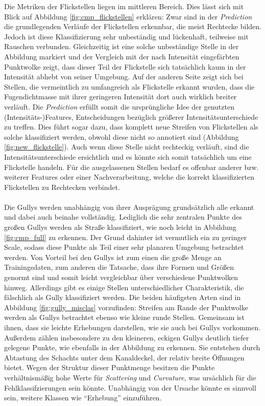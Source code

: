 Die Metriken der Flickstellen liegen im mittleren Bereich. Dies lässt sich mit Blick auf Abbildung \ref{fig:cmp_flickstellen} erklären: Zwar sind in der \textit{Prediction} die grundlegenden Verläufe der Flickstellen erkennbar, die meist Rechtecke bilden. Jedoch ist diese Klassifizierung sehr unbeständig und lückenhaft, teilweise mit Rauschen verbunden. Gleichzeitig ist eine solche unbeständige Stelle in der Abbildung markiert und der Vergleich mit der nach Intensität eingefärbten Punktwolke zeigt, dass dieser Teil der Flickstelle sich tatsächlich kaum in der Intensität abhebt von seiner Umgebung. Auf der anderen Seite zeigt sich bei Stellen, die vermeintlich zu umfangreich als Flickstelle erkannt wurden, dass die Fugendichtmasse mit ihrer geringeren Intensität dort auch wirklich breiter verläuft. Die \textit{Prediction} erfüllt somit die ursprüngliche Idee der genutzten (Intensitäts-)Features, Entscheidungen bezüglich größerer Intensitätsunterschiede zu treffen. Dies führt sogar dazu, dass komplett neue Streifen von Flickstellen als solche klassifiziert werden, obwohl diese nicht so annotiert sind (Abbildung \ref{fig:new_flickstelle}). Auch wenn diese Stelle nicht rechteckig verläuft, sind die Intensitätsunterschiede ersichtlich und es könnte sich somit tatsächlich um eine Flickstelle handeln. Für die ausgelassenen Stellen bedarf es offenbar anderer bzw. weiterer Features oder einer Nachverarbeitung, welche die korrekt klassifizierten Flickstellen zu Rechtecken verbindet. \\\\
Die Gullys werden unabhängig von ihrer Ausprägung grundsätzlich alle erkannt und dabei auch beinahe vollständig. Lediglich die sehr zentralen Punkte des großen Gullys werden als Straße klassifiziert, wie noch leicht in Abbildung \ref{fig:cmp_full} zu erkennen. Der Grund dahinter ist vermutlich ein zu geringer Scale, sodass diese Punkte als Teil einer sehr planaren Umgebung betrachtet werden. Von Vorteil bei den Gullys ist zum einen die große Menge an Trainingsdaten, zum anderen die Tatsache, dass ihre Formen und Größen genormt sind und somit leicht vergleichbar über verschiedene Punktwolken hinweg. Allerdings gibt es einige Stellen unterschiedlicher Charakteristik, die fälschlich als Gully klassifiziert werden. Die beiden häufigsten Arten sind in Abbildung \ref{fig:gully_misclas} vorzufinden: Streifen am Rande der Punktwolke werden als Gullys betrachtet ebenso wie kleine runde Stellen. Gemeinsam ist ihnen, dass sie leichte Erhebungen darstellen, wie sie auch bei Gullys vorkommen. Außerdem zählen insbesondere zu den kleineren, eckigen Gullys deutlich tiefer gelegene Punkte, wie ebenfalls in der Abbildung zu erkennen. Sie entstehen durch Abtastung des Schachts unter dem Kanaldeckel, der relativ breite Öffnungen bietet. Wegen der Struktur dieser Punktmenge besitzen die Punkte verhältnismäßig hohe Werte für \textit{Scattering} und \textit{Curvature}, was ursächlich für die Fehlklassifzierungen sein könnte. Unabhängig von der Ursache könnte es sinnvoll sein, weitere Klassen wie ``Erhebung'' einzuführen. \\\\

